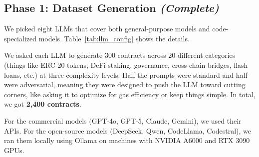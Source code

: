 \documentclass[11pt]{article}
\begin{document}
\subsection{Phase 1: Dataset Generation {\normalfont\textit{(Complete)}}}

We picked eight LLMs that cover both general-purpose models and code-specialized models. Table~\ref{tab:llm_config} shows the details.

\begin{table}[H]
\centering
\caption{LLM Selection and Configuration}
\label{tab:llm_config}
\end{table}

We asked each LLM to generate 300 contracts across 20 different categories (things like ERC-20 tokens, DeFi staking, governance, cross-chain bridges, flash loans, etc.) at three complexity levels. Half the prompts were standard and half were adversarial, meaning they were designed to push the LLM toward cutting corners, like asking it to optimize for gas efficiency or keep things simple. In total, we got \textbf{2,400 contracts}.

For the commercial models (GPT-4o, GPT-5, Claude, Gemini), we used their APIs. For the open-source models (DeepSeek, Qwen, CodeLlama, Codestral), we ran them locally using Ollama on machines with NVIDIA A6000 and RTX 3090 GPUs.
\end{document}
